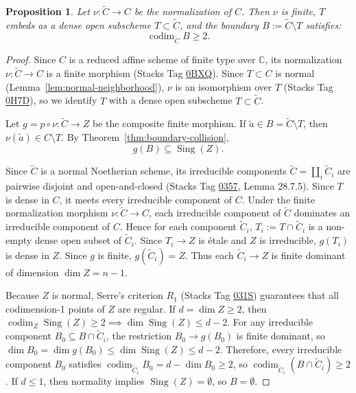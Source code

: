 \documentclass[11pt,reqno]{amsart}
\theoremstyle{plain}
\newtheorem{proposition}[theorem]{Proposition}
\theoremstyle{definition}
\numberwithin{equation}{section}
\DeclareMathOperator{\codim}{codim}
\DeclareMathOperator{\Sing}{Sing}
\newcommand{\C}{\mathbb{C}}
\begin{document}
\begin{proposition}\label{prop:boundary-codim-two}
Let $\nu: \widetilde{C} \to C$ be the normalization of $C$. Then $\nu$ is finite, $T$ embeds as a dense open subscheme $T \subset \widetilde{C}$, and the boundary $B := \widetilde{C} \setminus T$ satisfies:
\[
\codim_{\widetilde{C}} B \ge 2.
\]
\end{proposition}
\begin{proof}
Since $C$ is a reduced affine scheme of finite type over $\C$, its normalization $\nu: \widetilde{C} \to C$ is a finite morphism (Stacks Tag \href{https://stacks.math.columbia.edu/tag/0BXQ}{0BXQ}). Since $T \subset C$ is normal (Lemma~\ref{lem:normal-neighborhood}), $\nu$ is an isomorphism over $T$ (Stacks Tag \href{https://stacks.math.columbia.edu/tag/0H7D}{0H7D}), so we identify $T$ with a dense open subscheme $T \subset \widetilde{C}$.

Let $g = p \circ \nu: \widetilde{C} \to Z$ be the composite finite morphism.
If $\tilde{a} \in B = \widetilde{C} \setminus T$, then $\nu(\tilde{a}) \in C \setminus T$. By Theorem~\ref{thm:boundary-collision},
\[
g(B) \subseteq \Sing(Z).
\]

Since $\widetilde{C}$ is a normal Noetherian scheme, its irreducible components $\widetilde{C} = \coprod_i \widetilde{C}_i$ are pairwise disjoint and open-and-closed (Stacks Tag \href{https://stacks.math.columbia.edu/tag/0357}{0357}, Lemma 28.7.5).
Since $T$ is dense in $C$, it meets every irreducible component of $C$. Under the finite normalization morphism $\nu: \widetilde{C} \to C$, each irreducible component of $\widetilde{C}$ dominates an irreducible component of $C$. Hence for each component $\widetilde{C}_i$, $T_i := T \cap \widetilde{C}_i$ is a non-empty dense open subset of $\widetilde{C}_i$. Since $T_i \to Z$ is \'{e}tale and $Z$ is irreducible, $g(T_i)$ is dense in $Z$. Since $g$ is finite, $g(\widetilde{C}_i) = Z$. Thus each $\widetilde{C}_i \to Z$ is finite dominant of dimension $\dim Z = n-1$.

Because $Z$ is normal, Serre's criterion $R_1$ (Stacks Tag \href{https://stacks.math.columbia.edu/tag/031S}{031S}) guarantees that all codimension-1 points of $Z$ are regular.
If $d = \dim Z \ge 2$, then $\codim_Z \Sing(Z) \ge 2 \implies \dim \Sing(Z) \le d - 2$.
For any irreducible component $B_0 \subseteq B \cap \widetilde{C}_i$, the restriction $B_0 \to g(B_0)$ is finite dominant, so $\dim B_0 = \dim g(B_0) \le \dim \Sing(Z) \le d - 2$.
Therefore, every irreducible component $B_0$ satisfies $\codim_{\widetilde{C}_i} B_0 = d - \dim B_0 \ge 2$, so $\codim_{\widetilde{C}_i}(B \cap \widetilde{C}_i) \ge 2$.
If $d \le 1$, then normality implies $\Sing(Z) = \emptyset$, so $B = \emptyset$.
\end{proof}
\end{document}
